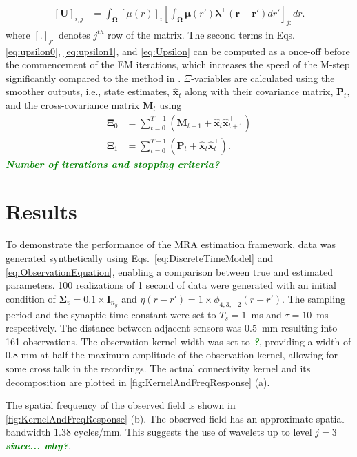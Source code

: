 \documentclass[journal,a4paper]{IEEEtran}
\newcommand{\dean}[1]{\textsf{\emph{\textbf{\textcolor{green}{#1}}}}}
\begin{document}
\begin{align}
\left[ \mathbf U\right] _{i,j}&=\int_{\boldsymbol \Omega}\left[\mu(r) \right]_i \left[\int_{\boldsymbol\Omega} \boldsymbol\mu\left(r'\right)\boldsymbol \lambda^\top \left(\mathbf{r-r'}\right) dr'\right]_{j:} dr.
\end{align}
where $[.]_{j:} $ denotes $j^{th}$ row of the matrix. The second terms in Eqs. \ref{eq:upsilon0}, \ref{eq:upsilon1}, and \ref{eq:Upsilon} can be computed as a once-off before the commencement of the EM iterations, which increases the speed of the M-step significantly compared to the method in \cite{Dewar2009}. $\Xi$-variables are calculated using the smoother outputs, i.e., state estimates, $\hat{\mathbf x}_t$ along with their covariance matrix, $\mathbf P_t$, and the cross-covariance matrix $\mathbf M_t$ using \cite{Gibsona2005}
\begin{align}\label{eq:Xivariables}
\boldsymbol\Xi_0&=\sum_{t=0}^{T-1}\left(\mathbf M_{t+1}+\mathbf{\hat x}_t\mathbf{\hat x}_{t+1}^\top\right) \\
 \boldsymbol\Xi_1&=\sum_{t=0}^{T-1}\left(\mathbf P_t+\mathbf{\hat x}_t\mathbf{\hat x}_t^\top\right).
\end{align}
\dean{Number of iterations and stopping criteria?}

\section{Results}
To demonstrate the performance of the MRA estimation framework, data was generated synthetically  using Eqs.~\ref{eq:DiscreteTimeModel} and \ref{eq:ObservationEquation}, enabling a comparison between true and estimated parameters. 100 realizations of 1 second of data were generated with an initial condition of $\boldsymbol\Sigma_v=0.1 \times \mathbf{I}_{n_y}$ and $\eta(r-r')=1\times\phi_{4,3,-2}(r-r')$. The sampling period and the synaptic time constant were set to $T_s = 1$~ms and $\tau = 10$~ms respectively. The distance between adjacent sensors was $0.5$~mm resulting into 161 observations. The observation kernel width was set to \dean{?}, providing a width of 0.8 mm at half the maximum amplitude of the observation kernel, allowing for some cross talk in the recordings. The actual connectivity kernel and its decomposition are plotted in \figurename{\ref{fig:KernelAndFreqResponse}} (a). 

The spatial frequency of the observed field is shown in \figurename{\ref{fig:KernelAndFreqResponse}} (b). The observed field has an approximate spatial bandwidth $1.38$ cycles/mm. This suggests the use of wavelets up to level $j=3$ \dean{since... why?}. 
\end{document}
